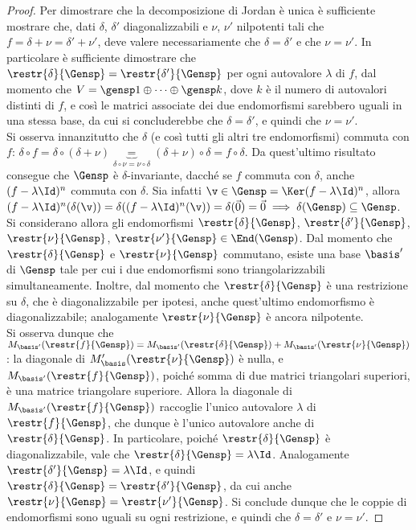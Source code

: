 \documentclass[11pt]{article}
\begin{document}
	\begin{proof}
		Per dimostrare che la decomposizione di Jordan è unica è sufficiente mostrare che, dati $\delta$, $\delta'$
		diagonalizzabili e $\nu$, $\nu'$ nilpotenti tali che $f = \delta + \nu = \delta' + \nu'$, deve valere
		necessariamente che $\delta = \delta'$ e che $\nu = \nu'$. In particolare è sufficiente dimostrare
		che $\restr{\delta}{\Gensp} = \restr{\delta'}{\Gensp}$ per ogni autovalore $\lambda$ di $f$, dal momento
		che $V = \gensp 1 \oplus \cdots \oplus \gensp k$, dove $k$ è il numero di autovalori distinti di $f$, e
		così le matrici associate dei due endomorfismi sarebbero uguali in una stessa base, da cui si concluderebbe che
		$\delta = \delta'$, e quindi che $\nu = \nu'$. \\
		
		Si osserva innanzitutto che $\delta$ (e così tutti gli altri tre endomorfismi) commuta con $f$:
		$\delta \circ f = \delta \circ (\delta + \nu) \underbrace{=}_{\delta \circ \nu = \nu \circ \delta} (\delta + \nu) \circ \delta = f \circ \delta$.
		Da quest'ultimo risultato consegue che $\Gensp$ è $\delta$-invariante, dacché se $f$ commuta con $\delta$,
		anche $(f - \lambda \Id)^n$ commuta con $\delta$. Sia infatti
		$\v \in \Gensp = \Ker (f - \lambda \Id)^n$, allora $(f - \lambda \Id)^n(\delta(\v)) = \delta((f - \lambda \Id)^n(\v)) = \delta(\vec 0) = \vec 0 \implies \delta(\Gensp) \subseteq \Gensp$. \\
		
		Si considerano allora gli endomorfismi $\restr{\delta}{\Gensp}$, $\restr{\delta'}{\Gensp}$, $\restr{\nu}{\Gensp}$, $\restr{\nu'}{\Gensp} \in \End(\Gensp)$. Dal momento che $\restr{\delta}{\Gensp}$
		e $\restr{\nu}{\Gensp}$ commutano, esiste una base $\basis'$ di $\Gensp$ tale per cui i due endomorfismi
		sono triangolarizzabili simultaneamente. Inoltre, dal momento che $\restr{\delta}{\Gensp}$ è una restrizione
		su $\delta$, che è diagonalizzabile per ipotesi, anche quest'ultimo endomorfismo è diagonalizzabile;
		analogamente $\restr{\nu}{\Gensp}$ è ancora nilpotente. \\
		
		Si osserva dunque che $M_{\basis'}(\restr{f}{\Gensp}) =
		M_{\basis'}(\restr{\delta}{\Gensp}) + M_{\basis'}(\restr{\nu}{\Gensp})$: la
		diagonale di $M_\basis'(\restr{\nu}{\Gensp})$ è nulla, e $M_{\basis'}(\restr{f}{\Gensp})$, poiché somma
		di due matrici triangolari superiori, è una matrice triangolare superiore. Allora la diagonale di
		$M_{\basis'}(\restr{f}{\Gensp})$ raccoglie l'unico autovalore $\lambda$ di $\restr{f}{\Gensp}$, che dunque è
		l'unico autovalore anche di $\restr{\delta}{\Gensp}$. In particolare, poiché $\restr{\delta}{\Gensp}$ è
		diagonalizzabile, vale che $\restr{\delta}{\Gensp} = \lambda \Id$. Analogamente $\restr{\delta'}{\Gensp} = \lambda \Id$, e quindi $\restr{\delta}{\Gensp} = \restr{\delta'}{\Gensp}$, da cui anche
		$\restr{\nu}{\Gensp} = \restr{\nu'}{\Gensp}$. Si conclude dunque che le coppie di endomorfismi sono
		uguali su ogni restrizione, e quindi che $\delta = \delta'$ e $\nu = \nu'$.
	\end{proof}
\end{document}
